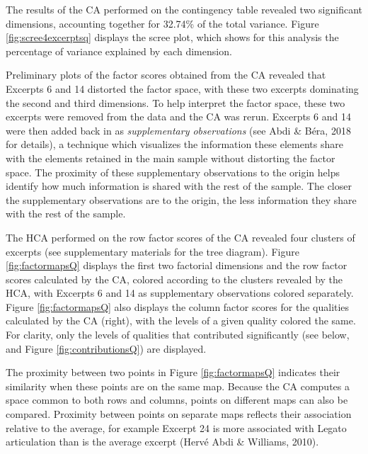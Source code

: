 \documentclass[
  english,
  man]{apa6}
\begin{document}
The results of the CA performed on the contingency table revealed two significant dimensions, accounting together for 32.74\% of the total variance. Figure \ref{fig:scree4excerptsq} displays the scree plot, which shows for this analysis the percentage of variance explained by each dimension.

Preliminary plots of the factor scores obtained from the CA revealed that Excerpts 6 and 14 distorted the factor space, with these two excerpts dominating the second and third dimensions. To help interpret the factor space, these two excerpts were removed from the data and the CA was rerun. Excerpts 6 and 14 were then added back in as \emph{supplementary observations} (see Abdi \& Béra, 2018 for details), a technique which visualizes the information these elements share with the elements retained in the main sample without distorting the factor space. The proximity of these supplementary observations to the origin helps identify how much information is shared with the rest of the sample. The closer the supplementary observations are to the origin, the less information they share with the rest of the sample.

The HCA performed on the row factor scores of the CA revealed four clusters of excerpts (see supplementary materials for the tree diagram). Figure \ref{fig:factormapsQ} displays the first two factorial dimensions and the row factor scores calculated by the CA, colored according to the clusters revealed by the HCA, with Excerpts 6 and 14 as supplementary observations colored separately. Figure \ref{fig:factormapsQ} also displays the column factor scores for the qualities calculated by the CA (right), with the levels of a given quality colored the same. For clarity, only the levels of qualities that contributed significantly (see below, and Figure \ref{fig:contributionsQ}) are displayed.

The proximity between two points in Figure \ref{fig:factormapsQ} indicates their similarity when these points are on the same map. Because the CA computes a space common to both rows and columns, points on different maps can also be compared. Proximity between points on separate maps reflects their association relative to the average, for example Excerpt 24 is more associated with Legato articulation than is the average excerpt (Hervé Abdi \& Williams, 2010).
\end{document}
